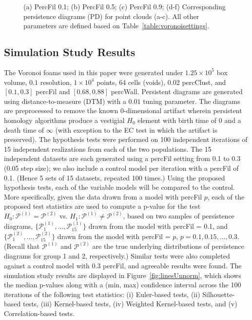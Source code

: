 \documentclass[12pt]{article}
\newcommand{\figref}[1]{Figure~\ref{#1}}
\begin{document}
\begin{center}
\begin{figure}[htp!]
\begin{subfigure}{.32\textwidth}
      \label{fig:percfil09pd}
    \end{subfigure}
      \caption{(a) PercFil 0.1; (b) PercFil 0.5; (c) PercFil 0.9; (d-f) Corresponding persistence diagrams (PD) for point clouds (a-c). All other parameters are defined based on Table~\ref{table:voronoisettings}.}
      \label{fig:percfilexample}
  \end{figure}
\end{center}

\subsection{Simulation Study Results}
\label{sec:results1}
The Voronoi foams used in this paper were generated under $1.25 \times  10^{5}$ box volume, $0.1$ resolution, $1 \times  10^{4}$ points, $64$ cells (voids), 0.02 percClust, and $[0.1, 0.3]$ percFil and $[0.68, 0.88]$ percWall. Persistent diagrams are generated using distance-to-measure (DTM) with a $0.01$ tuning parameter. The diagrams are preprocessed to remove the known 0-dimensional artifact wherein persistent homology algorithms produce a vestigial $H_{0}$ element with birth time of 0 and a death time of $\infty$ (with exception to the EC test in which the artifact is preserved). The hypothesis tests were performed on 100 independent iterations of 15 independent realizations from each of the two populations. The 15 independent datasets are each generated using a percFil setting from 0.1 to 0.3 (0.05 step size); we also include a control model per iteration with a percFil of 0.1. (Hence 5 sets of 15 datasets, repeated 100 times.) Using the proposed hypothesis tests, each of the variable models will be compared to the control. More specifically, given the data drawn from a model with percFil $p$, each of the proposed test statistics are used to compute a p-value for the test $H_0: \mathcal
P^{(1)} = \mathcal P^{(2)}$ vs. $H_1: \mathcal P^{(1)} \neq \mathcal P^{(2)}$,
based on two samples of persistence diagrams, $\{\mathcal
P_1^{(1)}, \ldots, \mathcal P_{15}^{(1)}\}$ drawn from the model with percFil = 0.1, and $\{\mathcal P_1^{(2)}, \ldots,
\mathcal P_{15}^{(2)}\}$ drawn from the model with percFil = $p$, $p = 0.1, 0.15, \ldots, 0.3$.
(Recall that $\mathcal P^{(1)}$ and $\mathcal P^{(2)}$ are the true underlying
distributions of persistence diagrams for group 1 and 2, respectively.)
Similar tests were also completed against a control model with 0.3 percFil, and agreeable results were found. The simulation study results are displayed in \figref{fig:linesUnnorm}, which shows the median p-values along with a (min, max) confidence interval across the 100 iterations of the following test statistics: (i) Euler-based tests, (ii) Silhouette-based tests, (iii) Kernel-based tests, (iv) Weighted Kernel-based tests, and (v) Correlation-based tests.
\end{document}
